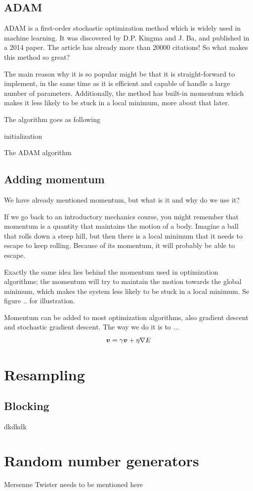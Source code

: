 \subsection{ADAM}
ADAM is a first-order stochastic optimization method which is widely used in machine learning. It was discovered by D.P. Kingma and J. Ba, and published in a 2014 paper. The article has already more than 20000 citations! \cite{kingma_adam:_2014} So what makes this method so great? 

The main reason why it is so popular might be that it is straight-forward to implement, in the same time as it is efficient and capable of handle a large number of parameters. Additionally, the method has built-in momentum which makes it less likely to be stuck in a local minimum, more about that later.

The algorithm goes as following

\begin{algorithm}[H]
\SetAlgoLined
{}
initialization\;
\caption{The ADAM algorithm}
\end{algorithm}

\subsection{Adding momentum}
We have already mentioned momentum, but what is it and why do we use it?

If we go back to an introductory mechanics course, you might remember that momentum is a quantity that maintains the motion of a body. Imagine a ball that rolls down a steep hill, but then there is a local minimum that it needs to escape to keep rolling. Because of its momentum, it will probably be able to escape. 

Exactly the same idea lies behind the momentum used in optimization algorithms; the momentum will try to maintain the motion towards the global minimum, which makes the system less likely to be stuck in a local minimum. Se figure .. for illustration. 

Momentum can be added to most optimization algorithms, also gradient descent and stochastic gradient descent. The way we do it is to ...
\begin{equation}
\boldsymbol{{v}} = \gamma\boldsymbol{{v}} + \eta\nabla E
\end{equation}

\section{Resampling}
\subsection{Blocking}
dkdkdk



\section{Random number generators} \label{sec:RNG}
Mersenne Twister needs to be mentioned here